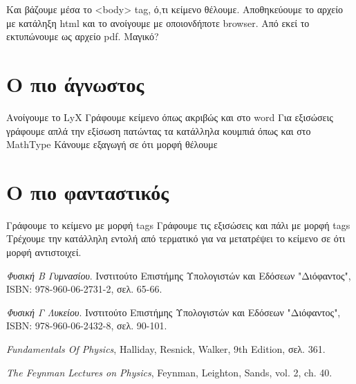 \documentclass[12pt,titlepage]{article}
\begin{document}
Και βάζουμε μέσα το <body> tag, ό,τι κείμενο θέλουμε.
Αποθηκεύουμε το αρχείο με κατάληξη html και το ανοίγουμε με οποιονδήποτε browser.
Από εκεί το εκτυπώνουμε ως αρχείο pdf.
Μαγικό?

\section{Ο πιο άγνωστος}
Ανοίγουμε το LyX
Γράφουμε κείμενο όπως ακριβώς και στο word
Για εξισώσεις γράφουμε απλά την εξίσωση πατώντας τα κατάλληλα κουμπιά όπως και στο MathType
Κάνουμε εξαγωγή σε ότι μορφή θέλουμε

\section{Ο πιο φανταστικός}
Γράφουμε το κείμενο με μορφή tags
Γράφουμε τις εξισώσεις και πάλι με μορφή tags
Τρέχουμε την κατάλληλη εντολή από τερματικό για να μετατρέψει το κείμενο σε ότι μορφή αντιστοιχεί.

\begin{thebibliography}{9}
 \textit{Φυσική Β Γυμνασίου}.
 Ινστιτούτο Επιστήμης Υπολογιστών και Εδόσεων "Διόφαντος", ISBN: 978-960-06-2731-2, σελ. 65-66.

 \textit{Φυσική Γ Λυκείου}.
 Ινστιτούτο Επιστήμης Υπολογιστών και Εδόσεων "Διόφαντος", ISBN: 978-960-06-2432-8, σελ. 90-101.

 \textit{Fundamentals Of Physics}, Halliday, Resnick, Walker, 9th Edition, σελ. 361.

 \textit{The Feynman Lectures on Physics}, Feynman, Leighton, Sands, vol. 2, ch. 40.

\end{thebibliography}
\end{document}
